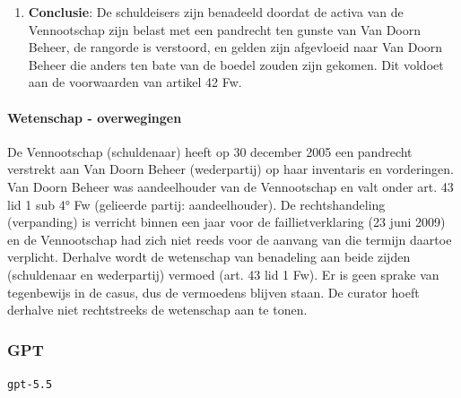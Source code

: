 \documentclass[
  dutch,
  a4paper,
]{article}
\providecommand{\tightlist}{%
  \setlength{\itemsep}{0pt}\setlength{\parskip}{0pt}}
\begin{document}
\begin{enumerate}
  \begin{itemize}
  \tightlist
  \item
    Van Doorn Beheer en Vewa wisten of behoorden te weten dat de verpanding en borgtocht tot benadeling van de schuldeisers van de Vennootschap zouden leiden, gelet op de constructie (verkoop van aandelen en vordering tegen een symbolische prijs, directe lening met zekerheid op de activa van de Vennootschap) en de latere betalingen door de Vennootschap aan Van Doorn Beheer.
  \end{itemize}
\item
  \textbf{Conclusie}: De schuldeisers zijn benadeeld doordat de activa van de Vennootschap zijn belast met een pandrecht ten gunste van Van Doorn Beheer, de rangorde is verstoord, en gelden zijn afgevloeid naar Van Doorn Beheer die anders ten bate van de boedel zouden zijn gekomen. Dit voldoet aan de voorwaarden van artikel 42 Fw.
\end{enumerate}

\paragraph{Wetenschap - overwegingen}\label{wetenschap---overwegingen}

De Vennootschap (schuldenaar) heeft op 30 december 2005 een pandrecht verstrekt aan Van Doorn Beheer (wederpartij) op haar inventaris en vorderingen. Van Doorn Beheer was aandeelhouder van de Vennootschap en valt onder art. 43 lid 1 sub 4° Fw (gelieerde partij: aandeelhouder). De rechtshandeling (verpanding) is verricht binnen een jaar voor de faillietverklaring (23 juni 2009) en de Vennootschap had zich niet reeds voor de aanvang van die termijn daartoe verplicht. Derhalve wordt de wetenschap van benadeling aan beide zijden (schuldenaar en wederpartij) vermoed (art. 43 lid 1 Fw). Er is geen sprake van tegenbewijs in de casus, dus de vermoedens blijven staan. De curator hoeft derhalve niet rechtstreeks de wetenschap aan te tonen.

\newpage


\subsubsection{GPT}\label{gpt}

\texttt{gpt-5.5}
\end{document}
